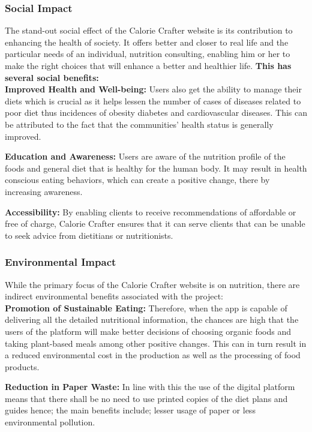 \documentclass[a4paper,12pt]{article}
\begin{document}
\subsubsection{Social Impact}
The stand-out social effect of the Calorie Crafter website is its contribution to enhancing the health of society. It offers better and closer to real life and the particular needs of an individual, nutrition consulting, enabling him or her to make the right choices that will enhance a better and healthier life. \textbf{This has several social benefits:} 
\vspace{1cm}
 \\ \noindent\textbf{Improved Health and Well-being:} Users also get the ability to manage their diets which is crucial as it helps lessen the number of cases of diseases related to poor diet thus incidences of obesity diabetes and cardiovascular diseases. This can be attributed to the fact that the communities’ health status is generally improved.

\noindent\textbf{Education and Awareness:} Users are aware of the nutrition profile of the foods and general diet that is healthy for the human body. It may result in health conscious eating behaviors, which can create a positive change, there by increasing awareness.

\noindent\textbf{Accessibility:} By enabling clients to receive recommendations of affordable or free of charge, Calorie Crafter ensures that it can serve clients that can be unable to seek advice from dietitians or nutritionists.


\subsubsection{Environmental Impact}
While the primary focus of the Calorie Crafter website is on nutrition, there are indirect environmental benefits associated with the project:\\
\noindent\textbf{Promotion of Sustainable Eating:} Therefore, when the app is capable of delivering all the detailed nutritional information, the chances are high that the users of the platform will make better decisions of choosing organic foods and taking plant-based meals among other positive changes. This can in turn result in a reduced environmental cost in the production as well as the processing of food products.

\noindent\textbf{Reduction in Paper Waste:} In line with this the use of the digital platform means that there shall be no need to use printed copies of the diet plans and guides hence; the main benefits include; lesser usage of paper or less environmental pollution.
\end{document}
